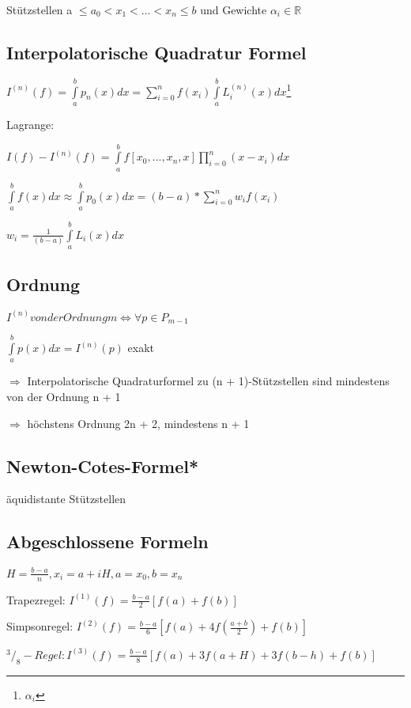 \documentclass[12pt,a4paper]{article} %
\newcommand*\tab[1][1cm]{\hspace*{#1}}
\newcommand*\rfrac[2]{{}^{#1}\!/_{#2}} %
\begin{document}
	Stützstellen a $\le a_0 < x_1 < ... < x_n \le b$ und Gewichte $\alpha_i \in \mathbb{R}$
	
	\subsection{Interpolatorische Quadratur Formel}
	
	$I^{(n)}(f) = \int\limits_{a}^{b}p_n(x)dx = \sum\limits_{i = 0}^nf(x_i)\int\limits_a^bL_i^{(n)}(x)dx$\footnote{$\alpha_i$}
	
	Lagrange:
	
	$I(f) - I^{(n)}(f) = \int\limits_a^bf[x_0, ..., x_n, x] \prod\limits_{i = 0}^n(x - x_i)dx$
	
	$\int\limits_a^bf(x)dx \approx \int\limits_a^bp_0(x)dx = (b - a) * \sum\limits_{i = 0}^nw_if(x_i)$
	
	$w_i = \frac{1}{(b - a)} \int\limits_a^bL_i(x)dx$
	
	\subsection{Ordnung}
	
	$I^{(n)}von der Ordnung m \Leftrightarrow \forall p \in P_{m - 1}$
	
	$\int\limits_a^bp(x)dx = I^{(n)}(p)$ \tab exakt
	
	$\Rightarrow$ Interpolatorische Quadraturformel zu (n + 1)-Stützstellen sind mindestens von der Ordnung n + 1
	
	$\Rightarrow$ höchstens Ordnung 2n + 2, mindestens n + 1
	
	\subsection{Newton-Cotes-Formel*}
	
	äquidistante Stützstellen
	
	\subsection{Abgeschlossene Formeln}
	
	$H = \frac{b - a}{n}, x_i = a + iH, a = x_0, b = x_n$
	
	Trapezregel: $I^{(1)}(f) = \frac{b - a}{2}[f(a) + f(b)]$
	
	Simpsonregel: $I^{(2)}(f) = \frac{b - a}{6}[f(a) + 4f(\frac{a + b}{2}) + f(b)]$
	
	$\rfrac{3}{8}-Regel: I^{(3)}(f) = \frac{b - a}{8}[f(a) + 3f(a + H) + 3f(b - h) + f(b)]$
	
\end{document}
